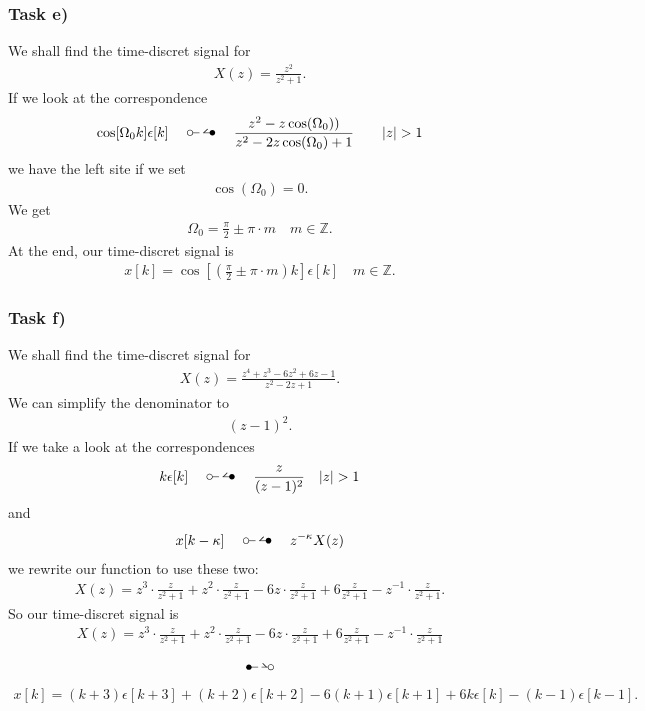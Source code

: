 \subsubsection{Task e)}
We shall find the time-discret signal for
\begin{align}
	X(z)=\frac{z^2}{z^2+1}.
\end{align}
If we look at the correspondence 
\begin{align}
	\cos [\Omega_0k]\epsilon[k]\quad\ztransf\quad \frac{z^2-z\cos(\Omega_0))}{z^2-2z\cos(\Omega_0)+1}\quad\quad |z| > 1
\end{align}
we have the left site if we set
\begin{align}
	\cos(\Omega_0)=0.
\end{align}
We get
\begin{align}
	\Omega_0 = \frac{\pi}{2} \pm \pi \cdot m \quad m \in \mathbb{Z}.
\end{align}
At the end, our time-discret signal is
\begin{align}
	x[k]=\cos[(\frac{\pi}{2}\pm \pi\cdot m)k]\epsilon[k]\quad m \in \mathbb{Z}.
\end{align}
\subsubsection{Task f)}
We shall find the time-discret signal for
\begin{align}
	X(z)=\frac{z^4+z^3-6z^2+6z-1}{z^2-2z+1}.
\end{align}
We can simplify the denominator to
\begin{align}
	(z-1)^2.
\end{align}
If we take a look at the correspondences
\begin{align}
	k\epsilon[k]\quad\ztransf\quad\frac{z}{(z-1)^2}\quad |z|>1
\end{align}
and
\begin{align}
	x[k-\kappa]\quad\ztransf\quad z^{-\kappa}X(z)
\end{align}
we rewrite our function to use these two:
\begin{align}
	X(z)=z^3\cdot\frac{z}{z^2+1}+z^2\cdot\frac{z}{z^2+1}-6z\cdot\frac{z}{z^2+1}+6\frac{z}{z^2+1}-z^{-1}\cdot\frac{z}{z^2+1}.
\end{align}
So our time-discret signal is
\begin{align}
	X(z)=z^3\cdot\frac{z}{z^2+1}+z^2\cdot\frac{z}{z^2+1}-6z\cdot\frac{z}{z^2+1}+6\frac{z}{z^2+1}-z^{-1}\cdot\frac{z}{z^2+1} \nonumber
\end{align}
\begin{align}
	\Ztransf \nonumber
\end{align}
\begin{align}
	x[k]=(k+3)\epsilon[k+3]+(k+2)\epsilon[k+2]-6(k+1)\epsilon[k+1]+6k\epsilon[k]-(k-1)\epsilon[k-1].
\end{align}
